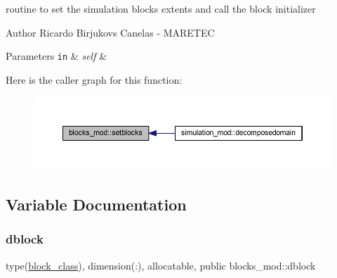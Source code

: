 routine to set the simulation blocks extents and call the block initializer 

\begin{DoxyAuthor}{Author}
Ricardo Birjukovs Canelas -\/ M\+A\+R\+E\+T\+EC 
\end{DoxyAuthor}

\begin{DoxyParams}[1]{Parameters}
\mbox{\tt in}  & {\em self} & \\
\hline
\end{DoxyParams}
Here is the caller graph for this function\+:\nopagebreak
\begin{figure}[H]
\begin{center}
\leavevmode
\includegraphics[width=350pt]{namespaceblocks__mod_a3312d23e0268d67aaf99d579aa57d0e7_icgraph}
\end{center}
\end{figure}


\subsection{Variable Documentation}
\mbox{\label{namespaceblocks__mod_ac8ad6e3cf7a812f95dadb592336aca50}} 
\subsubsection{\texorpdfstring{dblock}{dblock}}
{\footnotesize\ttfamily type(\hyperlink{structblocks__mod_1_1block__class}{block\+\_\+class}), dimension(\+:), allocatable, public blocks\+\_\+mod\+::dblock}

